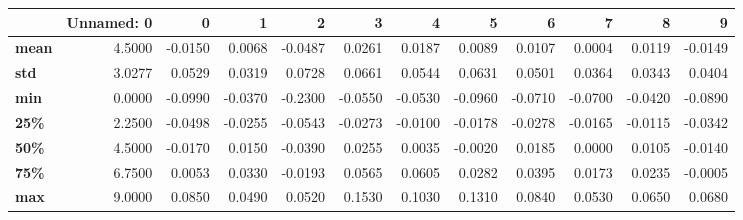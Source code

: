 \begin{tabular}{lrrrrrrrrrrr}
\toprule
{} &  Unnamed: 0 &       0 &       1 &       2 &       3 &       4 &       5 &       6 &       7 &       8 &       9 \\
\midrule
\textbf{mean} &      4.5000 & -0.0150 &  0.0068 & -0.0487 &  0.0261 &  0.0187 &  0.0089 &  0.0107 &  0.0004 &  0.0119 & -0.0149 \\
\textbf{std } &      3.0277 &  0.0529 &  0.0319 &  0.0728 &  0.0661 &  0.0544 &  0.0631 &  0.0501 &  0.0364 &  0.0343 &  0.0404 \\
\textbf{min } &      0.0000 & -0.0990 & -0.0370 & -0.2300 & -0.0550 & -0.0530 & -0.0960 & -0.0710 & -0.0700 & -0.0420 & -0.0890 \\
\textbf{25\% } &      2.2500 & -0.0498 & -0.0255 & -0.0543 & -0.0273 & -0.0100 & -0.0178 & -0.0278 & -0.0165 & -0.0115 & -0.0342 \\
\textbf{50\% } &      4.5000 & -0.0170 &  0.0150 & -0.0390 &  0.0255 &  0.0035 & -0.0020 &  0.0185 &  0.0000 &  0.0105 & -0.0140 \\
\textbf{75\% } &      6.7500 &  0.0053 &  0.0330 & -0.0193 &  0.0565 &  0.0605 &  0.0282 &  0.0395 &  0.0173 &  0.0235 & -0.0005 \\
\textbf{max } &      9.0000 &  0.0850 &  0.0490 &  0.0520 &  0.1530 &  0.1030 &  0.1310 &  0.0840 &  0.0530 &  0.0650 &  0.0680 \\
\bottomrule
\end{tabular}
